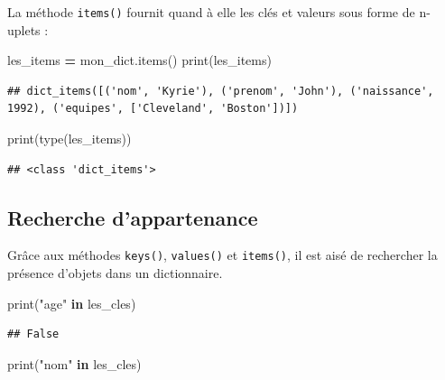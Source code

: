 \documentclass[
  12pt,
]{book}
\newenvironment{Shaded}{\begin{snugshade}}{\end{snugshade}}
\newcommand{\BuiltInTok}[1]{#1}
\newcommand{\KeywordTok}[1]{\textcolor[rgb]{0.13,0.29,0.53}{\textbf{#1}}}
\newcommand{\NormalTok}[1]{#1}
\newcommand{\OperatorTok}[1]{\textcolor[rgb]{0.81,0.36,0.00}{\textbf{#1}}}
\newcommand{\StringTok}[1]{\textcolor[rgb]{0.31,0.60,0.02}{#1}}
\numberwithin{equation}{section}
\numberwithin{countremarque}{section}
\begin{document}
La méthode \texttt{items()} fournit quand à elle les clés et valeurs sous forme de n-uplets :

\begin{Shaded}
\begin{Highlighting}[]
\NormalTok{les\_items }\OperatorTok{=}\NormalTok{ mon\_dict.items()}
\BuiltInTok{print}\NormalTok{(les\_items)}
\end{Highlighting}
\end{Shaded}

\begin{lstlisting}
## dict_items([('nom', 'Kyrie'), ('prenom', 'John'), ('naissance', 1992), ('equipes', ['Cleveland', 'Boston'])])
\end{lstlisting}

\begin{Shaded}
\begin{Highlighting}[]
\BuiltInTok{print}\NormalTok{(}\BuiltInTok{type}\NormalTok{(les\_items))}
\end{Highlighting}
\end{Shaded}

\begin{lstlisting}
## <class 'dict_items'>
\end{lstlisting}

\subsection{Recherche d'appartenance}\label{recherche-dappartenance}

Grâce aux méthodes \texttt{keys()}, \texttt{values()} et \texttt{items()}, il est aisé de rechercher la présence d'objets dans un dictionnaire.

\begin{Shaded}
\begin{Highlighting}[]
\BuiltInTok{print}\NormalTok{(}\StringTok{"age"} \KeywordTok{in}\NormalTok{ les\_cles)}
\end{Highlighting}
\end{Shaded}

\begin{lstlisting}
## False
\end{lstlisting}

\begin{Shaded}
\begin{Highlighting}[]
\BuiltInTok{print}\NormalTok{(}\StringTok{"nom"} \KeywordTok{in}\NormalTok{ les\_cles)}
\end{Highlighting}
\end{Shaded}
\end{document}
